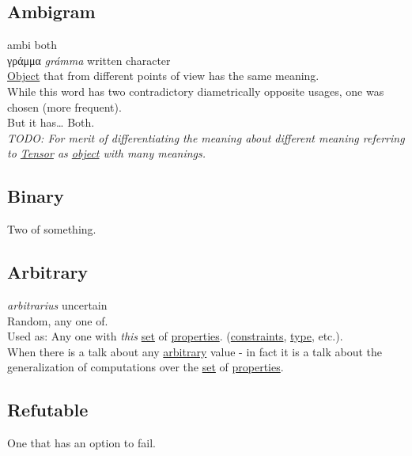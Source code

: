 \documentclass[a4paper,14pt,oneside]{book}
\begin{document}
\subsection{\label{org724c306}Ambigram}
\label{sec:org732a132}
ambi both\\
γράμμα \emph{grámma} written character\\

\hyperref[org920c789]{Object} that from different points of view has the same meaning.\\

While this word has two contradictory diametrically opposite usages, one was chosen (more frequent).\\

But it has\ldots{} Both.\\

\emph{TODO: For merit of differentiating the meaning about different meaning referring to \hyperref[org0fa63f6]{Tensor} as \hyperref[org920c789]{object} with many meanings.}\\

\subsection{\label{orgd4bd390}Binary}
\label{sec:org24ec2bd}
Two of something.\\

\subsection{\label{org43edc2a}Arbitrary}
\label{sec:orga793f09}
\emph{arbitrarius} uncertain\\

Random, any one of.\\

Used as: Any one with \emph{this} \hyperref[org2ca93d9]{set} of \hyperref[orge2c24e7]{properties}. (\hyperref[orgf2a4830]{constraints}, \hyperref[orgdbcea73]{type}, etc.).\\

When there is a talk about any \hyperref[org43edc2a]{arbitrary} value - in fact it is a talk about the generalization of computations over the \hyperref[org2ca93d9]{set} of \hyperref[orge2c24e7]{properties}.\\

\subsection{\label{org1606622}Refutable}
\label{sec:org1f568ab}
One that has an option to fail.\\
\end{document}
